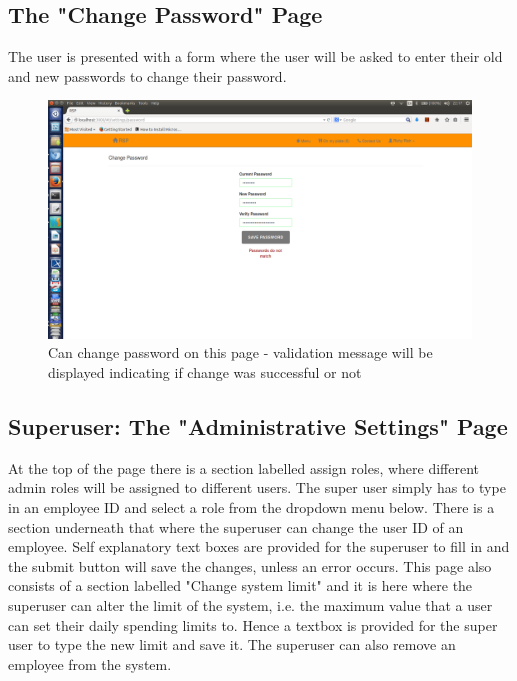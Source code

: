 \documentclass[a4paper,12pt]{report}
\begin{document}
\subsection{The "Change Password" Page} 
The user is presented with a form where the user will be asked to enter their old and new passwords to change their password. 

\begin{figure}[H]
  \centering
    \includegraphics[width=1.0\textwidth]{screenshots/changePassDontMatch.png}
    \caption{Can change password on this page - validation message will be displayed indicating if change was successful or not} 
\end{figure}
\subsection{Superuser: The "Administrative Settings" Page} 
At the top of the page there is a section labelled assign roles, where different admin roles will be assigned to different users. The super user simply has to type in an employee ID and select a role from the dropdown menu below. There is a section underneath that where the superuser can change the user ID of an employee. Self explanatory text boxes are provided for the superuser to fill in and the submit button will save the changes, unless an error occurs.  This page also consists of a section labelled "Change system limit" and it is here where the superuser can alter the limit of the system, i.e. the maximum value that a user can set their daily spending limits to. Hence a textbox is provided for the super user to type the new limit and save it.  The superuser can also remove an employee from the system.
 
\end{document}
